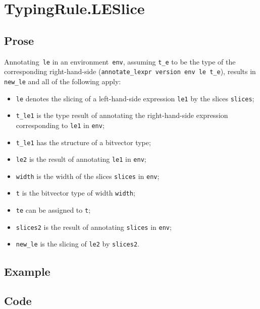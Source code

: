 \documentclass{book}
\begin{document}

\section{TypingRule.LESlice \label{sec:TypingRule.LESlice}}

  \subsection{Prose}
   Annotating~\texttt{le} in an environment~\texttt{env}, assuming
\texttt{t\_e} to be the type of the corresponding right-hand-side
(\texttt{annotate\_lexpr version env le t\_e}), results in \texttt{new\_le} and
all of the following apply:
   \begin{itemize}
   \item \texttt{le} denotes the slicing of a left-hand-side expression \texttt{le1} by the slices \texttt{slices};
   \item \texttt{t\_le1} is the type result of annotating the right-hand-side expression corresponding to \texttt{le1} in \texttt{env};
   \item \texttt{t\_le1} has the structure of a bitvector type;
   \item \texttt{le2} is the result of annotating \texttt{le1} in \texttt{env};
   \item \texttt{width} is the width of the slices \texttt{slices} in \texttt{env};
   \item \texttt{t} is the bitvector type of width \texttt{width};
   \item \texttt{te} can be assigned to \texttt{t};
   \item \texttt{slices2} is the result of annotating \texttt{slices} in \texttt{env};
   \item \texttt{new\_le} is the slicing of \texttt{le2} by \texttt{slices2}.
   \end{itemize}
 
  \subsection{Example}

  \subsection{Code}
\end{document}
